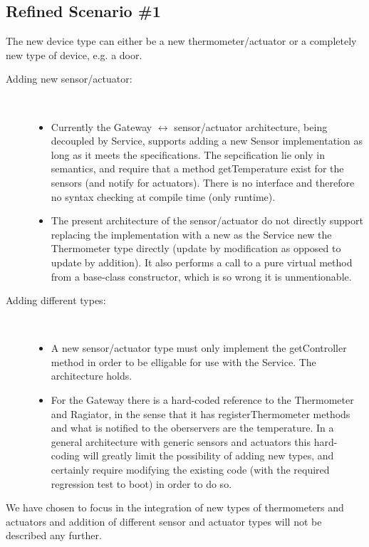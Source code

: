 \documentclass[a4paper,10pt]{article}
\begin{document}
\subsection{Refined Scenario \#1}
The new device type can either be a new thermometer/actuator or a completely new type of device, e.g. a door. 

\begin{description}
\item[Adding new sensor/actuator:] \
\begin{itemize}
\item Currently the Gateway $\leftrightarrow$ sensor/actuator architecture, being decoupled by Service, supports adding a new Sensor implementation as long as it meets the specifications. The sepcification lie only in semantics, and require that a method getTemperature exist for the sensors (and notify for actuators). There is no interface and therefore no syntax checking at compile time (only runtime).
\item The present architecture of the sensor/actuator do not directly support replacing the implementation with a new as the Service new the Thermometer type directly (update by modification as opposed to update by addition). It also performs a call to a pure virtual method from a base-class constructor, which is so wrong it is unmentionable.
\end{itemize}
\item[Adding different types:] \
\begin{itemize}
\item A new sensor/actuator type must only implement the getController method in order to be elligable for use with the Service. The architecture holds.
\item For the Gateway there is a hard-coded reference to the Thermometer and Ragiator, in the sense that it has registerThermometer methods and what is notified to the oberservers are the temperature. In a general architecture with generic sensors and actuators this hard-coding will greatly limit the possibility of adding new types, and certainly require modifying the existing code (with the required regression test to boot) in order to do so. 
\end{itemize}
\end{description}

We have chosen to focus in the integration of new types of thermometers and actuators and
addition of different sensor and actuator types will not be described any further.
\end{document}
